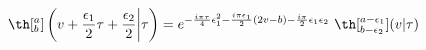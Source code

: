 \begin{equation} \label{t12}
    \th[^a_b]\left(v+{\epsilon_1\over 2}\tau+{\epsilon_2\over 2}
    \bigg|\tau\right) = e^{-{i\pi\tau\over
    4}\epsilon_1^2-{i\pi\epsilon_1 \over 2}(2v-b)- {i\pi \over
    2}\epsilon_1\epsilon_2}~\th[^{a-\epsilon_1}_{b-\epsilon_2}](v|\tau) 
\end{equation}

